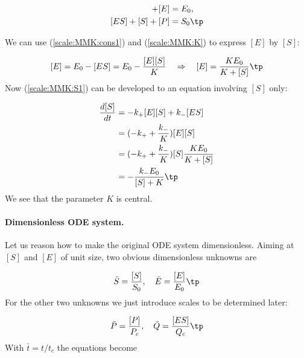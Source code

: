 \documentclass[graybox,envcountchap,sectrefs,final]{svmonodo}
\begin{document}
\begin{align}
[ES] + [E] &= E_0,
\label{scale:MMK:cons1}\\ 
[ES] + [S] + [P] &= S_0\tp
\label{scale:MMK:cons2}
\end{align}

We can use (\ref{scale:MMK:cons1}) and (\ref{scale:MMK:K}) to
express $[E]$ by $[S]$:

\[ [E] = E_0 - [ES] = E_0 - \frac{[E][S]}{K}\quad\Rightarrow\quad
[E] = \frac{KE_0}{K + [S]}\tp\]
Now (\ref{scale:MMK:S1}) can be developed to an equation involving
$[S]$ only:

\begin{align}
\frac{d[S]}{dt} &= -k_+[E][S] + k_-[ES]\nonumber\\ 
& = (-k_+ + \frac{k_-}{K})[E][S]\nonumber\\ 
& = (-k_+ + \frac{k_-}{K})[S]\frac{KE_0}{K + [S]}\nonumber\\ 
& = - \frac{k_-E_0}{[S] + K}\tp
\label{scale:MMK:Seq1}
\end{align}
We see that the parameter $K$ is central.


\paragraph{Dimensionless ODE system.}
Let us reason how to make the original ODE system dimensionless.
Aiming at $[S]$ and $[E]$ of unit size, two obvious dimensionless
unknowns are

\[ \bar S = \frac{[S]}{S_0},\quad
\bar E = \frac{[E]}{E_0}\tp\]
For the other two unknowns we just introduce scales to be determined
later:

\[
\bar P = \frac{[P]}{P_c},\quad
\bar{Q} = \frac{[ES]}{Q_c}\tp
\]
With $\bar t = t/t_c$ the equations become
\end{document}
